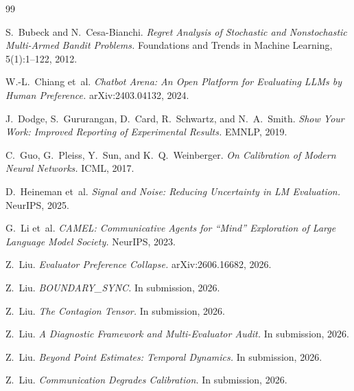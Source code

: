 \documentclass[11pt]{article}
\begin{document}

\begin{thebibliography}{99}

 S.~Bubeck and N.~Cesa-Bianchi.
\newblock \textit{Regret Analysis of Stochastic and Nonstochastic Multi-Armed Bandit Problems.}
\newblock Foundations and Trends in Machine Learning, 5(1):1--122, 2012.

 W.-L.~Chiang et~al.
\newblock \textit{Chatbot Arena: An Open Platform for Evaluating LLMs by Human Preference.}
\newblock arXiv:2403.04132, 2024.

 J.~Dodge, S.~Gururangan, D.~Card, R.~Schwartz, and N.~A.~Smith.
\newblock \textit{Show Your Work: Improved Reporting of Experimental Results.}
\newblock EMNLP, 2019.

 C.~Guo, G.~Pleiss, Y.~Sun, and K.~Q.~Weinberger.
\newblock \textit{On Calibration of Modern Neural Networks.}
\newblock ICML, 2017.

 D.~Heineman et~al.
\newblock \textit{Signal and Noise: Reducing Uncertainty in LM Evaluation.}
\newblock NeurIPS, 2025.

 G.~Li et~al.
\newblock \textit{CAMEL: Communicative Agents for ``Mind'' Exploration of Large Language Model Society.}
\newblock NeurIPS, 2023.

 Z.~Liu.
\newblock \textit{Evaluator Preference Collapse.}
\newblock arXiv:2606.16682, 2026.

 Z.~Liu.
\newblock \textit{BOUNDARY\_SYNC.} In submission, 2026.

 Z.~Liu.
\newblock \textit{The Contagion Tensor.} In submission, 2026.

 Z.~Liu.
\newblock \textit{A Diagnostic Framework and Multi-Evaluator Audit.} In submission, 2026.

 Z.~Liu.
\newblock \textit{Beyond Point Estimates: Temporal Dynamics.} In submission, 2026.

 Z.~Liu.
\newblock \textit{Communication Degrades Calibration.} In submission, 2026.


\end{thebibliography}
\end{document}
